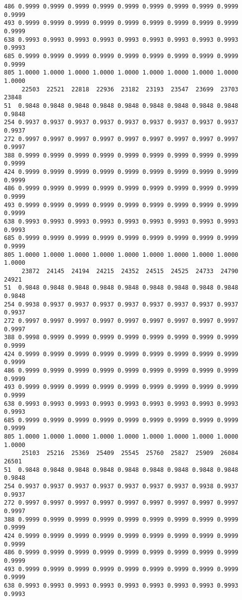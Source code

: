 \documentclass[
]{report}
\begin{document}
\begin{verbatim}
486 0.9999 0.9999 0.9999 0.9999 0.9999 0.9999 0.9999 0.9999 0.9999 0.9999
493 0.9999 0.9999 0.9999 0.9999 0.9999 0.9999 0.9999 0.9999 0.9999 0.9999
638 0.9993 0.9993 0.9993 0.9993 0.9993 0.9993 0.9993 0.9993 0.9993 0.9993
685 0.9999 0.9999 0.9999 0.9999 0.9999 0.9999 0.9999 0.9999 0.9999 0.9999
805 1.0000 1.0000 1.0000 1.0000 1.0000 1.0000 1.0000 1.0000 1.0000 1.0000
     22503  22521  22818  22936  23182  23193  23547  23699  23703  23848
51  0.9848 0.9848 0.9848 0.9848 0.9848 0.9848 0.9848 0.9848 0.9848 0.9848
254 0.9937 0.9937 0.9937 0.9937 0.9937 0.9937 0.9937 0.9937 0.9937 0.9937
272 0.9997 0.9997 0.9997 0.9997 0.9997 0.9997 0.9997 0.9997 0.9997 0.9997
388 0.9999 0.9999 0.9999 0.9999 0.9999 0.9999 0.9999 0.9999 0.9999 0.9999
424 0.9999 0.9999 0.9999 0.9999 0.9999 0.9999 0.9999 0.9999 0.9999 0.9999
486 0.9999 0.9999 0.9999 0.9999 0.9999 0.9999 0.9999 0.9999 0.9999 0.9999
493 0.9999 0.9999 0.9999 0.9999 0.9999 0.9999 0.9999 0.9999 0.9999 0.9999
638 0.9993 0.9993 0.9993 0.9993 0.9993 0.9993 0.9993 0.9993 0.9993 0.9993
685 0.9999 0.9999 0.9999 0.9999 0.9999 0.9999 0.9999 0.9999 0.9999 0.9999
805 1.0000 1.0000 1.0000 1.0000 1.0000 1.0000 1.0000 1.0000 1.0000 1.0000
     23872  24145  24194  24215  24352  24515  24525  24733  24790  24921
51  0.9848 0.9848 0.9848 0.9848 0.9848 0.9848 0.9848 0.9848 0.9848 0.9848
254 0.9938 0.9937 0.9937 0.9937 0.9937 0.9937 0.9937 0.9937 0.9937 0.9937
272 0.9997 0.9997 0.9997 0.9997 0.9997 0.9997 0.9997 0.9997 0.9997 0.9997
388 0.9998 0.9999 0.9999 0.9999 0.9999 0.9999 0.9999 0.9999 0.9999 0.9999
424 0.9999 0.9999 0.9999 0.9999 0.9999 0.9999 0.9999 0.9999 0.9999 0.9999
486 0.9999 0.9999 0.9999 0.9999 0.9999 0.9999 0.9999 0.9999 0.9999 0.9999
493 0.9999 0.9999 0.9999 0.9999 0.9999 0.9999 0.9999 0.9999 0.9999 0.9999
638 0.9993 0.9993 0.9993 0.9993 0.9993 0.9993 0.9993 0.9993 0.9993 0.9993
685 0.9999 0.9999 0.9999 0.9999 0.9999 0.9999 0.9999 0.9999 0.9999 0.9999
805 1.0000 1.0000 1.0000 1.0000 1.0000 1.0000 1.0000 1.0000 1.0000 1.0000
     25103  25216  25369  25409  25545  25760  25827  25909  26084  26501
51  0.9848 0.9848 0.9848 0.9848 0.9848 0.9848 0.9848 0.9848 0.9848 0.9848
254 0.9937 0.9937 0.9937 0.9937 0.9937 0.9937 0.9937 0.9938 0.9937 0.9937
272 0.9997 0.9997 0.9997 0.9997 0.9997 0.9997 0.9997 0.9997 0.9997 0.9997
388 0.9999 0.9999 0.9999 0.9999 0.9999 0.9999 0.9999 0.9999 0.9999 0.9999
424 0.9999 0.9999 0.9999 0.9999 0.9999 0.9999 0.9999 0.9999 0.9999 0.9999
486 0.9999 0.9999 0.9999 0.9999 0.9999 0.9999 0.9999 0.9999 0.9999 0.9999
493 0.9999 0.9999 0.9999 0.9999 0.9999 0.9999 0.9999 0.9999 0.9999 0.9999
638 0.9993 0.9993 0.9993 0.9993 0.9993 0.9993 0.9993 0.9993 0.9993 0.9993

\end{verbatim}
\end{document}
